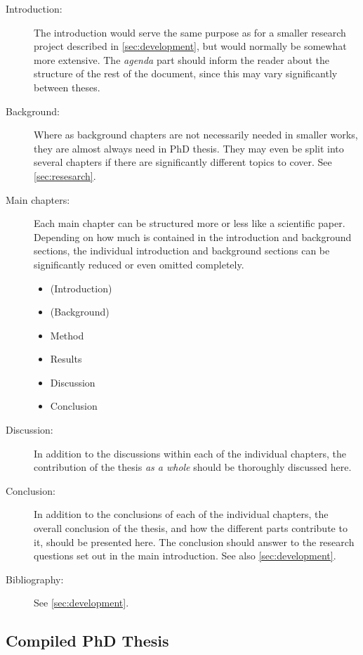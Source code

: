 \begin{description}
    \item[Introduction:] The introduction would serve the same purpose as for a smaller research project described in \cref{sec:development}, but would normally be somewhat more extensive. The \emph{agenda} part should inform the reader about the structure of the rest of the document, since this may vary significantly between theses.
    \item[Background:] Where as background chapters are not necessarily needed in smaller works, they are almost always need in PhD thesis. They may even be split into several chapters if there are significantly different topics to cover. See \cref{sec:resesarch}.
    \item[Main chapters:] Each main chapter can be structured more or less like a scientific paper. Depending on how much is contained in the introduction and background sections, the individual introduction and background sections can be significantly reduced or even omitted completely.
    \begin{itemize}
        \item (Introduction)
        \item (Background)
        \item Method
        \item Results
        \item Discussion
        \item Conclusion
    \end{itemize}
    \item[Discussion:] In addition to the discussions within each of the individual chapters, the contribution of the thesis \emph{as a whole} should be thoroughly discussed here.
    \item[Conclusion:] In addition to the conclusions of each of the individual chapters, the overall conclusion of the thesis, and how the different parts contribute to it, should be presented here. The conclusion should answer to the research questions set out in the main introduction. See also \cref{sec:development}.
    \item[Bibliography:] See \cref{sec:development}.
\end{description}

\subsection{Compiled PhD Thesis}
\label{sec:compiledphd}

